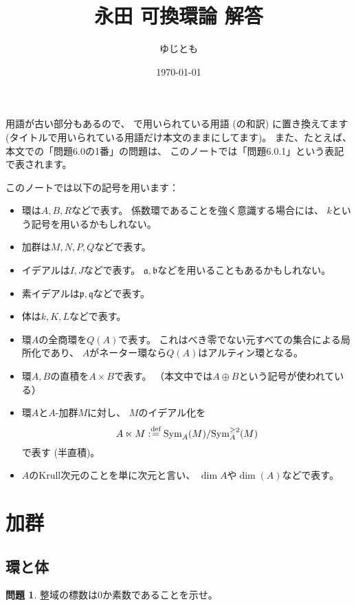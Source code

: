 \documentclass[uplatex]{jsarticle}
\title{永田 可換環論 解答}
\author{ゆじとも}
\date{\today}
\theoremstyle{definition}
\newtheorem{prob}[prob]{問題}
\def\dfn{:\overset{\mbox{{\scriptsize def}}}{=}}
\begin{document}
\maketitle
\setcounter{subsection}{-1}


用語が古い部分もあるので、
\cite{stacks-project}で用いられている用語 (の和訳) に置き換えてます
(タイトルで用いられている用語だけ本文のままにしてます)。
また、たとえば、本文での「問題6.0の1番」の問題は、
このノートでは「問題6.0.1」という表記で表されます。

このノートでは以下の記号を用います：

\begin{itemize}
  \item
  環は\(A,B,R\)などで表す。
  係数環であることを強く意識する場合には、
  \(k\)という記号を用いるかもしれない。
  \item
  加群は\(M,N,P,Q\)などで表す。
  \item
  イデアルは\(I,J\)などで表す。
  \(\mathfrak{a,b}\)などを用いることもあるかもしれない。
  \item
  素イデアルは\(\mathfrak{p,q}\)などで表す。
  \item
  体は\(k,K,L\)などで表す。
  \item
  環\(A\)の全商環を\(Q(A)\)で表す。
  これはべき零でない元すべての集合による局所化であり、
  \(A\)がネーター環なら\(Q(A)\)はアルティン環となる。
  \item
  環\(A,B\)の直積を\(A\times B\)で表す。
  （本文中では\(A\oplus B\)という記号が使われている）
  \item
  環\(A\)と\(A\)-加群\(M\)に対し、
  \(M\)のイデアル化を
  \[A\ltimes M \dfn \mathrm{Sym}_A(M)/\mathrm{Sym}_A^{\geq 2}(M)\]
  で表す (半直積)。
  \item
  \(A\)のKrull次元のことを単に次元と言い、
  \(\dim A\)や\(\dim(A)\)などで表す。
\end{itemize}


\section{加群}

\label{section 1}


\subsection{環と体}

\begin{prob}\label{prob: 1.0.1}
  整域の標数は\(0\)か素数であることを示せ。
\end{prob}
\end{document}
